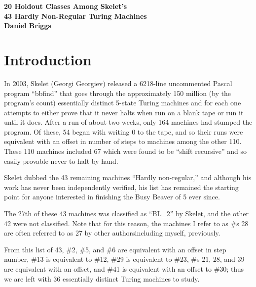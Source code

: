 \documentclass[12pt]{article}
\begin{document}
\begin{center}
 
{\bf\large 20 Holdout Classes Among Skelet's\\ 43 Hardly Non-Regular Turing Machines} \\
 
 
 
       \textbf{Daniel Briggs}


\end{center}

\begin{abstract}
\href{https://github.com/danbriggs/Turing/blob/master/doc/record7-19-20.txt}{github.com/danbriggs/Turing/blob/master/doc/record7-19-20.txt} is where the reader is encouraged to go to get the state diagrams.
\end{abstract}

\section*{Introduction}
In 2003, Skelet (Georgi Georgiev) released a 6218-line uncommented Pascal program ``bbfind'' that goes through the approximately 150 million (by the program's count) essentially distinct 5-state Turing machines and for each one attempts to either prove that it never halts when run on a blank tape or run it until it does. After a run of about two weeks, only 164 machines had stumped the program. Of these, 54 began with writing 0 to the tape, and so their runs were equivalent with an offset in number of steps to machines among the other 110. These 110 machines included 67 which were found to be ``shift recursive'' and so easily provable never to halt by hand.

Skelet dubbed the 43 remaining machines ``Hardly non-regular,'' and although his work has never been independently verified, his list has remained the starting point for anyone interested in finishing the Busy Beaver of 5 ever since.

The 27th of these 43 machines was classified as ``BL\_2'' by Skelet, and the other 42 were not classified. Note that for this reason, the machines I refer to as \#s 28 are often referred to as 27 by other authors\textemdash including myself, previously.

From this list of 43, \#2, \#5, and \#6 are equivalent with an offset in step number, \#13 is equivalent to \#12,  \#29 is equivalent to \#23, \#s 21, 28, and 39 are equivalent with an offset,  and \#41 is equivalent with an offset to \#30; thus we are left with 36 essentially distinct Turing machines to study.
\end{document}
